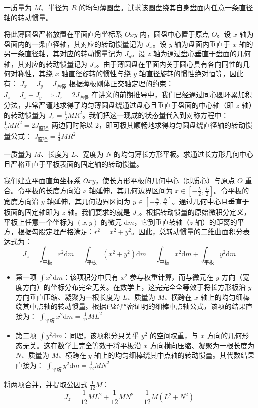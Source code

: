 \begin{example}
一质量为 $M$、半径为 $R$ 的均匀薄圆盘。试求该圆盘绕其自身盘面内任意一条直径轴的转动惯量。
\end{example}
\begin{solution}
 将此薄圆盘严格放置在平面直角坐标系 $Oxy$ 内，圆盘中心置于原点 $O$。设 $x$ 轴为盘面内的一条直径轴，其对应的转动惯量记为 $J_x$。设 $y$ 轴为盘面内垂直于 $x$ 轴的另一条直径轴，其对应的转动惯量记为 $J_y$。设 $z$ 轴为通过盘心垂直于盘面的几何轴，其对应的转动惯量记为 $J_z$。由于薄圆盘在平面内关于圆心具有各向同性的几何对称性，其绕 $x$ 轴直径旋转的惯性与绕 $y$ 轴直径旋转的惯性绝对恒等，因此有： \(J_x = J_y = J_{\text{直径}}\) 根据薄板刚体正交轴定理的约束： \(J_z = J_x + J_y \implies J_z = 2J_{\text{直径}}\) 在讲义的前期推导中，我们已经通过同心圆环累加积分法，非常严谨地求得了均匀薄圆盘绕通过盘心且垂直于盘面的中心轴（即 $z$ 轴）的转动惯量为 $J_z = \frac{1}{2}MR^2$。我们把这一现成的状态量代入到对称方程中： \(\frac{1}{2}MR^2 = 2J_{\text{直径}}\) 两边同时除以 2，即可极其顺畅地求得均匀圆盘绕直径轴的转动惯量公式： \(J_{\text{直径}} = \frac{1}{4}MR^2\) 
\end{solution}

\begin{example}
一质量为 $M$、长度为 $L$、宽度为 $N$ 的均匀薄长方形平板。求通过长方形几何中心且严格垂直于平板表面的固定轴的转动惯量。
\end{example}
\begin{solution}
 我们建立平面直角坐标系 $Oxy$，使长方形平板的几何中心（即质心）与原点 $O$ 重合。令平板的长度方向沿 $x$ 轴延伸，其几何边界区间为 $x \in \left[-\frac{L}{2}, \frac{L}{2}\right]$。令平板的宽度方向沿 $y$ 轴延伸，其几何边界区间为 $y \in \left[-\frac{N}{2}, \frac{N}{2}\right]$。通过几何中心且垂直于板面的固定轴即为 $z$ 轴。我们要求的就是 $J_z$。根据转动惯量的原始微积分定义，平板上任意一个坐标为 $(x, y)$ 的微元 $\mathrm{d}m$，它到垂直转轴（$z$ 轴）的距离的平方，根据勾股定理严格满足：$r^2 = x^2 + y^2$。因此，总转动惯量的二维曲面积分表达式为：$$J_z = \int_{\text{平板}} r^2 \mathrm{d}m = \int_{\text{平板}} (x^2 + y^2) \mathrm{d}m= \int_{\text{平板}} x^2 \mathrm{d}m + \int_{\text{平板}} y^2 \mathrm{d}m$$
 \begin{itemize}
 \item 第一项 $\int x^2 \mathrm{d}m$：该项积分中只有 $x^2$ 参与权重计算，而与微元在 $y$ 方向（宽度方向）的坐标分布完全无关。在数学上，这完完全全等效于将长方形板沿 $y$ 方向垂直压缩、凝聚为一根长度为 $L$、质量为 $M$、横跨在 $x$ 轴上的均匀细棒绕其中点轴的转动惯量。根据已经严密证明的细棒中点轴公式，该项的结果直接为： \(\int_{\text{平板}} x^2 \mathrm{d}m = \frac{1}{12}ML^2\) 
 \item 第二项 $\int y^2 \mathrm{d}m$：同理，该项积分只关乎 $y^2$ 的空间权重，与 $x$ 方向的几何形态无关。这在数学上完全等效于将平板沿 $x$ 方向横向压缩、凝聚为一根长度为 $N$、质量为 $M$、横跨在 $y$ 轴上的均匀细棒绕其中点轴的转动惯量。其代数结果直接为： \(\int_{\text{平板}} y^2 \mathrm{d}m = \frac{1}{12}MN^2\) 
 \end{itemize}
 将两项合并，并提取公因式 $\frac{1}{12}M$：$$J_z = \frac{1}{12}ML^2 + \frac{1}{12}MN^2 = \frac{1}{12}M(L^2 + N^2)$$
\end{solution}


